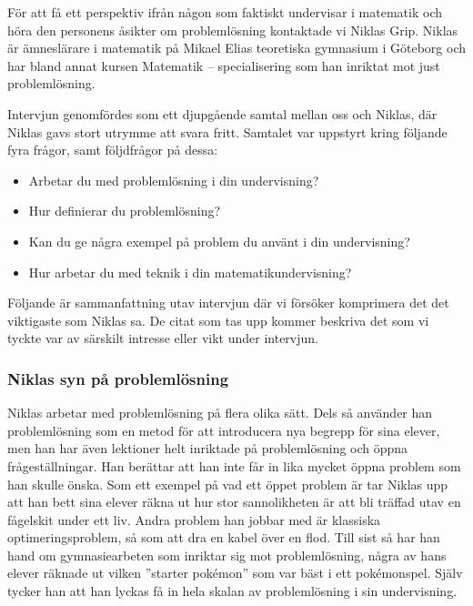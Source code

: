 \textcolor{turkos}{
För att få ett perspektiv ifrån någon som faktiskt undervisar i matematik och höra den personens åsikter om problemlösning kontaktade vi Niklas Grip. Niklas är ämneslärare i matematik på Mikael Elias teoretiska gymnasium i Göteborg och har bland annat kursen Matematik – specialisering som han inriktat mot just problemlösning.
}

\textcolor{turkos}{
Intervjun genomfördes som ett djupgående samtal mellan oss och Niklas, där Niklas gavs stort utrymme att svara fritt. Samtalet var uppstyrt kring följande fyra frågor, samt följdfrågor på dessa: 
}
\begin{itemize}
  \item \textcolor{turkos}{Arbetar du med problemlösning i din undervisning?}
  \item \textcolor{turkos}{Hur definierar du problemlösning?}
  \item \textcolor{turkos}{Kan du ge några exempel på problem du använt i din undervisning?}
  \item \textcolor{turkos}{Hur arbetar du med teknik i din matematikundervisning?}
\end{itemize}

\noindent \textcolor{turkos}{
Följande är sammanfattning utav intervjun där vi försöker komprimera det det viktigaste som Niklas sa. De citat som tas upp kommer beskriva det som vi tyckte var av särskilt intresse eller vikt under intervjun. 
}

\subsubsection{Niklas syn på problemlösning}

\textcolor{turkos}{
Niklas arbetar med problemlösning på flera olika sätt. Dels så använder han problemlösning som en metod för att introducera nya begrepp för sina elever, men han har även lektioner helt inriktade på problemlösning och öppna frågeställningar. Han berättar att han inte får in lika mycket öppna problem som han skulle önska. Som ett exempel på vad ett öppet problem är tar Niklas upp att han bett sina elever räkna ut hur stor sannolikheten är att bli träffad utav en fågelskit under ett liv. Andra problem han jobbar med är klassiska optimeringsproblem, så som att dra en kabel över en flod. Till sist så har han hand om gymnasiearbeten som inriktar sig mot problemlösning, några av hans elever räknade ut vilken ''starter pokémon'' som var bäst i ett pokémonspel. Själv tycker han att han lyckas få in hela skalan av problemlösning i sin undervisning.
}

